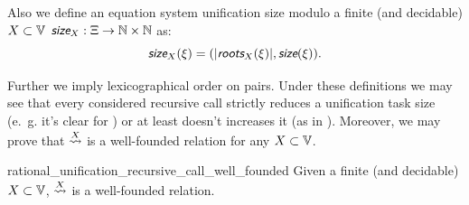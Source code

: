 Also we define an equation system unification size modulo a finite (and decidable) $X \subset \mathbb{V}$ $\size_X : \Xi \rightarrow \N \times \N$ as:
\[\size_X(\xi) = (|\roots_X(\xi)|, \size(\xi)).\]

Further we imply lexicographical order on pairs. Under these definitions we may see that every considered recursive call strictly reduces a unification task size (e.~g. it's clear for ) or at least doesn't increases it (as in ). Moreover, we may prove that $\mathrel{\overset{X}{\rightsquigarrow}}$ is a well-founded relation for any $X \subset \mathbb{V}$.

\begin{rocqlemma}{rational_unification_recursive_call_well_founded}
    Given a finite (and decidable) $X \subset \mathbb{V}$, $\mathrel{\overset{X}{\rightsquigarrow}}$ is a well-founded relation.
    \label{lemma:reccall-wf}
\end{rocqlemma}

